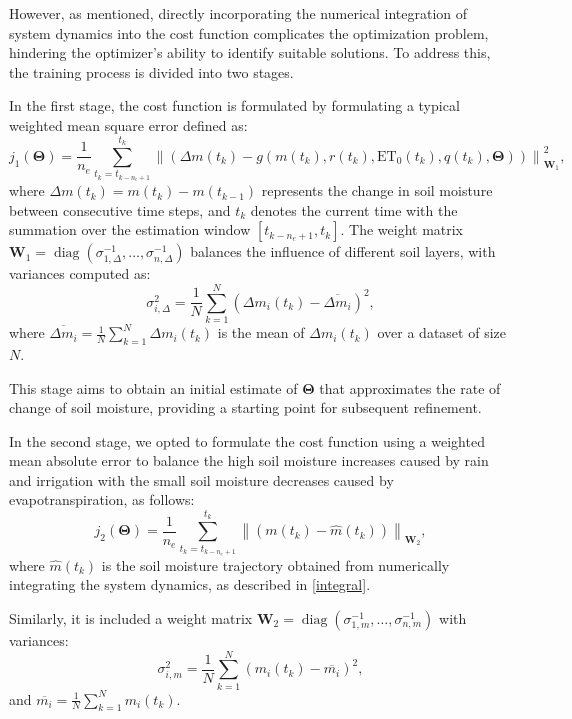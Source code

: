 \documentclass[pdflatex,sn-nature]{sn-jnl}%
\theoremstyle{thmstyleone}%
\theoremstyle{thmstyletwo}%
\theoremstyle{thmstylethree}%
\begin{document}
However, as mentioned, directly incorporating the numerical integration of system dynamics into the cost function complicates the optimization problem, hindering the optimizer's ability to identify suitable solutions. To address this, the training process is divided into two stages.


In the first stage, the cost function is formulated by formulating a typical weighted mean square error defined as:
\begin{equation}
    j_{1}(\boldsymbol{\Theta}) = 
    \frac{1}{n_e} \sum_{t_k = t_{k - n_e + 1}}^{t_k} 
    \left\| 
         \left( 
            \Delta m(t_k) - g(m(t_k), r(t_k), \mathrm{ET_0}(t_k), q(t_k), \boldsymbol{\Theta}) 
        \right) 
    \right\|_{\mathbf{W}_1}^2,
    \label{eq:j1}
\end{equation}
where \( \Delta m(t_k) = m(t_k) - m(t_{k-1}) \) represents the change in soil moisture between consecutive time steps, and \( t_k \) denotes the current time with the summation over the estimation window \( [t_{k - n_e + 1}, t_k] \). The weight matrix \( \mathbf{W}_1 = \operatorname{diag}(\sigma_{1,\Delta}^{-1}, \dots, \sigma_{n,\Delta}^{-1}) \) balances the influence of different soil layers, with variances computed as:
\[
    \sigma_{i,\Delta}^{2} = \frac{1}{N} \sum_{k=1}^{N} \left( \Delta m_i(t_k) - \overline{\Delta m_i} \right)^{2},
\]
where \( \overline{\Delta m_i} = \frac{1}{N} \sum_{k=1}^{N} \Delta m_i(t_k) \) is the mean of \( \Delta m_i(t_k) \) over a dataset of size \( N \).

This stage aims to obtain an initial estimate of \( \boldsymbol{\Theta} \) that approximates the rate of change of soil moisture, providing a starting point for subsequent refinement.

In the second stage, we opted to formulate the cost function using a weighted mean absolute error to balance the high soil moisture increases caused by rain and irrigation with the small soil moisture decreases caused by evapotranspiration, as follows:
\begin{equation}
    j_{2}(\boldsymbol{\Theta}) = 
    \frac{1}{n_e} \sum_{t_k = t_{k - n_e + 1}}^{t_k} 
    \left\| 
         \left( 
            m(t_k) - \hat{m}(t_k) 
        \right) 
    \right\|_{\mathbf{W}_2},
    \label{eq:j2}
\end{equation}
where \( \hat{m}(t_k) \) is the soil moisture trajectory obtained from numerically integrating the system dynamics, as described in \eqref{integral}. 

Similarly, it is included a weight matrix \( \mathbf{W}_2 = \operatorname{diag}(\sigma_{1,m}^{-1}, \dots, \sigma_{n,m}^{-1}) \) with variances:
\[
    \sigma_{i,m}^{2} = \frac{1}{N} \sum_{k=1}^{N} \left( m_i(t_k) - \overline{m_i} \right)^{2},
\]
and  \( \overline{m_i} = \frac{1}{N} \sum_{k=1}^{N} m_i(t_k) \).
\end{document}
